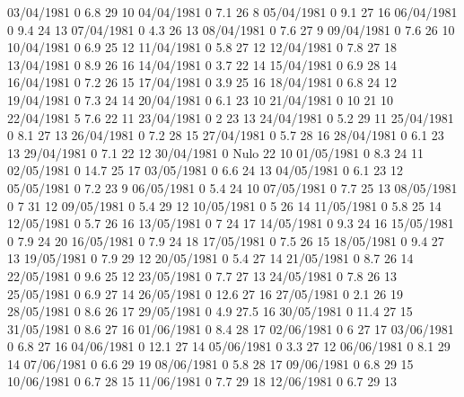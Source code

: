 03/04/1981  0      6.8    29     10 
04/04/1981  0      7.1    26     8 
05/04/1981  0      9.1    27     16 
06/04/1981  0      9.4    24     13 
07/04/1981  0      4.3    26     13 
08/04/1981  0      7.6    27     9 
09/04/1981  0      7.6    26     10 
10/04/1981  0      6.9    25     12 
11/04/1981  0      5.8    27     12 
12/04/1981  0      7.8    27     18 
13/04/1981  0      8.9    26     16 
14/04/1981  0      3.7    22     14 
15/04/1981  0      6.9    28     14 
16/04/1981  0      7.2    26     15 
17/04/1981  0      3.9    25     16 
18/04/1981  0      6.8    24     12 
19/04/1981  0      7.3    24     14 
20/04/1981  0      6.1    23     10 
21/04/1981  0      10     21     10 
22/04/1981  5      7.6    22     11 
23/04/1981  0      2      23     13 
24/04/1981  0      5.2    29     11 
25/04/1981  0      8.1    27     13 
26/04/1981  0      7.2    28     15 
27/04/1981  0      5.7    28     16 
28/04/1981  0      6.1    23     13 
29/04/1981  0      7.1    22     12 
30/04/1981  0     Nulo    22     10 
01/05/1981  0      8.3    24     11 
02/05/1981  0      14.7   25     17 
03/05/1981  0      6.6    24     13 
04/05/1981  0      6.1    23     12 
05/05/1981  0      7.2    23     9 
06/05/1981  0      5.4    24     10 
07/05/1981  0      7.7    25     13 
08/05/1981  0      7      31     12 
09/05/1981  0      5.4    29     12 
10/05/1981  0      5      26     14 
11/05/1981  0      5.8    25     14 
12/05/1981  0      5.7    26     16 
13/05/1981  0      7      24     17 
14/05/1981  0      9.3    24     16 
15/05/1981  0      7.9    24     20 
16/05/1981  0      7.9    24     18 
17/05/1981  0      7.5    26     15 
18/05/1981  0      9.4    27     13 
19/05/1981  0      7.9    29     12 
20/05/1981  0      5.4    27     14 
21/05/1981  0      8.7    26     14 
22/05/1981  0      9.6    25     12 
23/05/1981  0      7.7    27     13 
24/05/1981  0      7.8    26     13 
25/05/1981  0      6.9    27     14 
26/05/1981  0      12.6   27     16 
27/05/1981  0      2.1    26     19 
28/05/1981  0      8.6    26     17 
29/05/1981  0      4.9    27.5   16 
30/05/1981  0      11.4   27     15 
31/05/1981  0      8.6    27     16 
01/06/1981  0      8.4    28     17 
02/06/1981  0      6      27     17 
03/06/1981  0      6.8    27     16 
04/06/1981  0      12.1   27     14 
05/06/1981  0      3.3    27     12 
06/06/1981  0      8.1    29     14 
07/06/1981  0      6.6    29     19 
08/06/1981  0      5.8    28     17 
09/06/1981  0      6.8    29     15 
10/06/1981  0      6.7    28     15 
11/06/1981  0      7.7    29     18 
12/06/1981  0      6.7    29     13 
